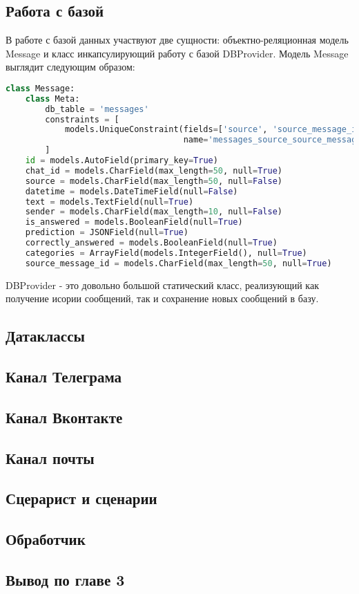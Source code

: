     \subsection{Работа с базой}
    В работе с базой данных участвуют две сущности: объектно-реляционная модель Message
    и класс инкапсулирующий работу с базой DBProvider.
    Модель Message выглядит следующим образом:
\begin{lstlisting}[language=Python]
class Message:
    class Meta:
        db_table = 'messages'
        constraints = [
            models.UniqueConstraint(fields=['source', 'source_message_id'],
                                    name='messages_source_source_message_id_key')
        ]
    id = models.AutoField(primary_key=True)
    chat_id = models.CharField(max_length=50, null=True)
    source = models.CharField(max_length=50, null=False)
    datetime = models.DateTimeField(null=False)
    text = models.TextField(null=True)
    sender = models.CharField(max_length=10, null=False)
    is_answered = models.BooleanField(null=True)
    prediction = JSONField(null=True)
    correctly_answered = models.BooleanField(null=True)
    categories = ArrayField(models.IntegerField(), null=True)
    source_message_id = models.CharField(max_length=50, null=True)
\end{lstlisting}
    DBProvider - это довольно большой статический класс, реализующий как получение исории сообщений,
    так и сохранение новых сообщений в базу.

    \subsection{Датаклассы}
    \subsection{Канал Телеграма}
    \subsection{Канал Вконтакте}
    \subsection{Канал почты}
    \subsection{Сцерарист и сценарии}
    \subsection{Обработчик}
    \subsection*{Вывод по главе 3}
